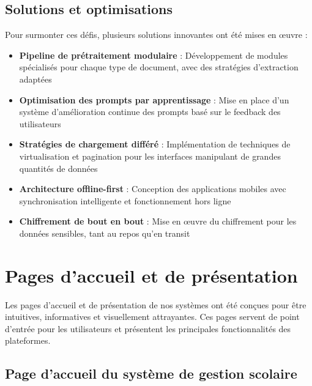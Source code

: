 \subsection{Solutions et optimisations}

Pour surmonter ces défis, plusieurs solutions innovantes ont été mises en œuvre :

\begin{itemize}
  \item \textbf{Pipeline de prétraitement modulaire} : Développement de modules spécialisés pour chaque type de document, avec des stratégies d'extraction adaptées
  
  \item \textbf{Optimisation des prompts par apprentissage} : Mise en place d'un système d'amélioration continue des prompts basé sur le feedback des utilisateurs
  
  \item \textbf{Stratégies de chargement différé} : Implémentation de techniques de virtualisation et pagination pour les interfaces manipulant de grandes quantités de données
  
  \item \textbf{Architecture offline-first} : Conception des applications mobiles avec synchronisation intelligente et fonctionnement hors ligne
  
  \item \textbf{Chiffrement de bout en bout} : Mise en œuvre du chiffrement pour les données sensibles, tant au repos qu'en transit
\end{itemize}

\section{Pages d'accueil et de présentation}

Les pages d'accueil et de présentation de nos systèmes ont été conçues pour être intuitives, informatives et visuellement attrayantes. Ces pages servent de point d'entrée pour les utilisateurs et présentent les principales fonctionnalités des plateformes.

\subsection{Page d'accueil du système de gestion scolaire}

